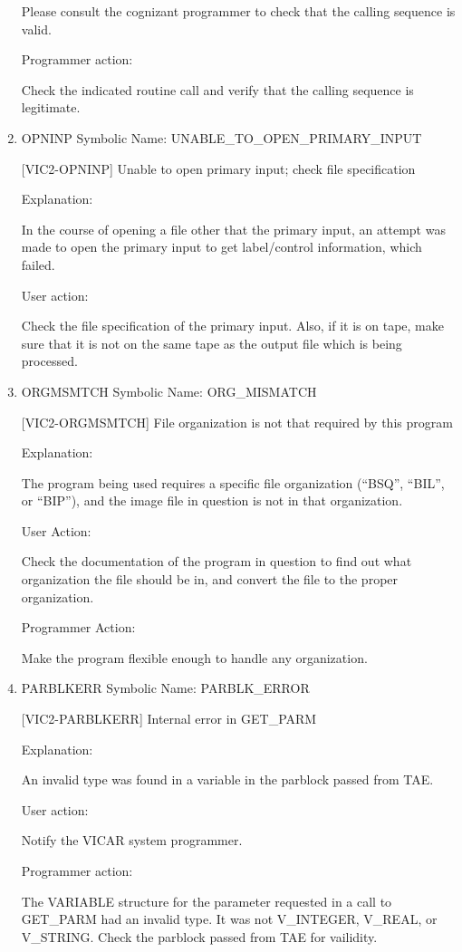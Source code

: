 \begin{enumerate}
Please consult the cognizant programmer to check that the
calling sequence is valid.

Programmer action:

Check the indicated routine call and verify that the calling
sequence is legitimate.


\item OPNINP Symbolic Name: UNABLE\_TO\_OPEN\_PRIMARY\_INPUT

[VIC2-OPNINP] Unable to open primary input; check file specification

Explanation:

In the course of opening a file other that the primary input,
an attempt was made to open the primary input to get
label/control information, which failed.

User action:

Check the file specification of the primary input.  Also, if it is
on tape, make sure that it is not on the same tape as the output
file which is being processed.


\item ORGMSMTCH Symbolic Name: ORG\_MISMATCH

[VIC2-ORGMSMTCH] File organization is not that required by this program

Explanation:

The program being used requires a specific file organization
(``BSQ'', ``BIL'', or ``BIP''), and the image file in question
is not in that organization.

User Action:

Check the documentation of the program in question to find out
what organization the file should be in, and convert the file
to the proper organization.

Programmer Action:

Make the program flexible enough to handle any organization.


\item PARBLKERR Symbolic Name: PARBLK\_ERROR

[VIC2-PARBLKERR] Internal error in GET\_PARM

Explanation:

An invalid type was found in a variable in the parblock
passed from TAE.

User action:

Notify the VICAR system programmer.

Programmer action:

The VARIABLE structure for the parameter requested in a call
to GET\_PARM had an invalid type.  It was not V\_INTEGER, V\_REAL,
or V\_STRING.  Check the parblock passed from TAE for vailidity.



\end{enumerate}

